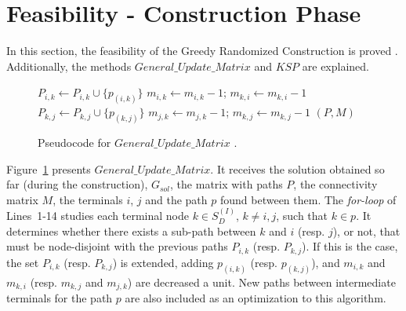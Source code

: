 \section{Feasibility - Construction Phase}
In this section, the feasibility of the Greedy Randomized Construction is proved \cite{11}. 
Additionally, the methods $General\_Update\_Matrix$ and $KSP$ are explained. 

\begin{figure}[H]
\begin{algorithm}[H]
\caption{$(P,M) = General\_Update\_Matrix(G_{sol},P,M,p,i,j)$}
\begin{algorithmic}[1]
\STATE $P_{i,k} \leftarrow P_{i,k} \cup \{p_{(i,k)}\}$
\STATE $m_{i,k} \leftarrow m_{i,k}-1$; $m_{k,i}\leftarrow m_{k,i}-1$
\ENDIF
\ENDIF
{}
\STATE $P_{k,j} \leftarrow P_{k,j} \cup \{p_{(k,j)}\}$
\STATE $m_{j,k} \leftarrow m_{j,k}-1$; $m_{k,j}\leftarrow m_{k,j}-1$
\ENDIF
\ENDIF
\ENDFOR
\RETURN $(P,M)$
\end{algorithmic}
\end{algorithm}
\caption{Pseudocode for $General\_Update\_Matrix$ \cite{11}.\label{gum}}
\end{figure}
Figure~\ref{gum} presents $General\_Update\_Matrix$. 
It receives the solution obtained so far (during the construction), $G_{sol}$, 
the matrix with paths $P$, the connectivity matrix $M$, the terminals $i$, $j$ and 
the path $p$ found between them. The \textit{for-loop} of Lines~1-14 studies 
each terminal node $k \in S_{D}^{(I)}$, $k \neq i,j$, such that $k \in p$. It determines 
whether there exists a sub-path between $k$ and $i$ (resp. $j$), or not, that must 
be node-disjoint with the previous paths $P_{i,k}$ (resp. $P_{k,j}$). If this is the case, 
the set $P_{i,k}$ (resp. $P_{k,j}$) is extended, adding $p_{(i,k)}$ (resp. $p_{(k,j)}$), and  
$m_{i,k}$ and $m_{k,i}$ (resp. $m_{k,j}$ and $m_{j,k}$) are decreased a unit. 
New paths between intermediate terminals for the path $p$ are also included as an optimization to this algorithm.    

